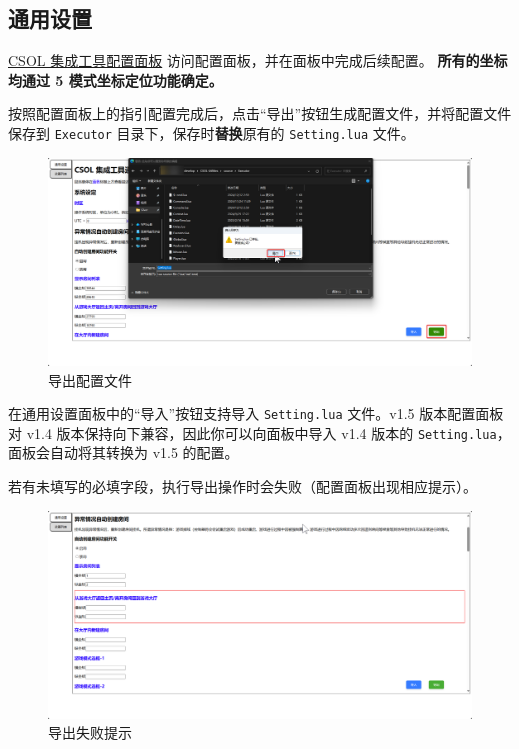 \subsection{通用设置}

\href{https://www.macrohard.fun/CSOL-Utilities/panel}{CSOL 集成工具配置面板} 访问配置面板，并在面板中完成后续配置。
\textbf{\color{red}所有的坐标均通过 5 模式坐标定位功能确定。}

按照配置面板上的指引配置完成后，点击“导出”按钮生成配置文件，并将配置文件保存到 \lstinline{Executor} 目录下，保存时\textbf{\color{red}替换}原有的 \lstinline{Setting.lua} 文件。

\begin{figure}[H]
    \Centering
    \includegraphics[width=\textwidth]{assets/export_setting}
    \caption{导出配置文件}
    \label{ch2fig-export-setting}
\end{figure}

在通用设置面板中的“导入”按钮支持导入 \lstinline{Setting.lua} 文件。v1.5 版本配置面板对 v1.4 版本保持向下兼容，因此你可以向面板中导入 v1.4 版本的 \lstinline{Setting.lua}，面板会自动将其转换为 v1.5 的配置。

若有未填写的必填字段，执行导出操作时会失败（配置面板出现相应提示）。

\begin{figure}[H]
    \Centering
    \includegraphics[width=\textwidth]{assets/export_error}
    \caption{导出失败提示}
\end{figure}

